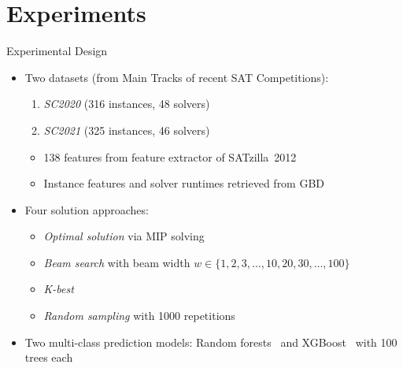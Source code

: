 \documentclass[en]{sdqbeamer}
\begin{document}
\section{Experiments}

\begin{frame}[t]{Experimental Design}
	\begin{itemize}
		\item Two datasets (from Main Tracks of recent SAT Competitions):
		\begin{enumerate}[1)]
			\item \emph{SC2020} (316 instances, 48 solvers)~\cite{balyo2020proceedings}
			\item \emph{SC2021} (325 instances, 46 solvers)~\cite{balyo2021proceedings}
		\end{enumerate}
		\begin{itemize}
			\item 138 features from feature extractor of SATzilla~2012~\cite{xu2012features, xu2012satzilla2012}
			\item Instance features and solver runtimes retrieved from GBD~\cite{iser2020collaborative}
		\end{itemize}
		\pause
		\vspace{\baselineskip}
		\item Four solution approaches:
		\begin{itemize}
			\item \emph{Optimal solution} via MIP solving~\cite{python-mip}
			\item \emph{Beam search} with beam width $w \in \{1, 2, 3, \dots, 10, 20, 30, \dots, 100\}$
			\item \emph{K-best}
			\item \emph{Random sampling} with 1000 repetitions
		\end{itemize}
		\pause
		\vspace{\baselineskip}
		\item Two multi-class prediction models: Random forests~\cite{breiman2001random, scikit-learn} and XGBoost~\cite{xgboost} with 100 trees each
	\end{itemize}
\end{frame}
\end{document}
